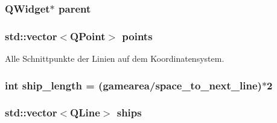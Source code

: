\subsubsection[{\texorpdfstring{parent}{parent}}]{\setlength{\rightskip}{0pt plus 5cm}Q\+Widget$\ast$ parent\hspace{0.3cm}{\ttfamily [protected]}}\hypertarget{classGUI_1_1CoordinateSystem_a1799d742cabf4aedc2b3553023ccd368}{}\label{classGUI_1_1CoordinateSystem_a1799d742cabf4aedc2b3553023ccd368}
\subsubsection[{\texorpdfstring{points}{points}}]{\setlength{\rightskip}{0pt plus 5cm}std\+::vector$<$Q\+Point$>$ points\hspace{0.3cm}{\ttfamily [protected]}}\hypertarget{classGUI_1_1CoordinateSystem_af6b75c3f51fa26c16961a577565e177e}{}\label{classGUI_1_1CoordinateSystem_af6b75c3f51fa26c16961a577565e177e}


Alle Schnittpunkte der Linien auf dem Koordinatensystem. 

\subsubsection[{\texorpdfstring{ship\+\_\+length}{ship_length}}]{\setlength{\rightskip}{0pt plus 5cm}int ship\+\_\+length = ({\bf gamearea}/{\bf space\+\_\+to\+\_\+next\+\_\+line})$\ast$2\hspace{0.3cm}{\ttfamily [protected]}}\hypertarget{classGUI_1_1CoordinateSystem_aee01da46fa67198ecaa2f6f4d640c4be}{}\label{classGUI_1_1CoordinateSystem_aee01da46fa67198ecaa2f6f4d640c4be}
\subsubsection[{\texorpdfstring{ships}{ships}}]{\setlength{\rightskip}{0pt plus 5cm}std\+::vector$<$Q\+Line$>$ ships}\hypertarget{classGUI_1_1CoordinateSystem_aace79121ea432bad20264eafaec2e60f}{}\label{classGUI_1_1CoordinateSystem_aace79121ea432bad20264eafaec2e60f}


